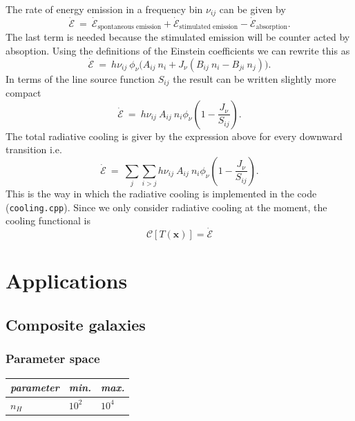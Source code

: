 \documentclass[]{article}
\begin{document}
The rate of energy emission in a frequency bin $\nu_{ij}$ can be given by
\begin{equation}
\dot{\mathcal{E}} \ = \ \dot{\mathcal{E}}_{\text{spontaneous emission}} + \dot{\mathcal{E}}_{\text{stimulated emission}} - \dot{\mathcal{E}}_{\text{absorption}} .
\end{equation}
The last term is needed because the stimulated emission will be counter acted by absoption. Using the definitions of the Einstein coefficients we can rewrite this as
\begin{equation}
\dot{\mathcal{E}} \ = \ h\nu_{ij} \ \phi_{\nu} \Big( A_{ij} \ n_{i}  + J_{\nu} \left( B_{ij} \ n_{i} - B_{ji} \ n_{j} \right) \Big).
\end{equation}
In terms of the line source function $S_{ij}$ the result can be written slightly more compact
\begin{equation}
\dot{\mathcal{E}} \ = \ h\nu_{ij} \ A_{ij} \ n_{i}  \phi_{\nu} \left( 1  - \frac{J_{\nu}}{S_{ij}} \right).
\end{equation}
The total radiative cooling is giver by the expression above for every downward transition i.e.
\begin{equation}
\dot{\mathcal{E}} \ = \ \sum_{j} \sum_{i>j} h\nu_{ij} \ A_{ij} \ n_{i}  \phi_{\nu} \left( 1  - \frac{J_{\nu}}{S_{ij}} \right).
\end{equation}
This is the way in which the radiative cooling is implemented in the code (\texttt{cooling.cpp}). Since we only consider radiative cooling at the moment, the cooling functional is
\begin{equation}
\mathcal{C}\left[T(\textbf{x})\right] = \dot{\mathcal{E}}
\end{equation}


\section{Applications}

\subsection{Composite galaxies}

\subsubsection{Parameter space}

\begin{tabular}{ l | l | l}
  \textit{parameter} & \textit{min.} & \textit{max.} \\ \hline
  $n_{H}$            & $10^2$        & $10^4$ \\
\end{tabular}
\end{document}

